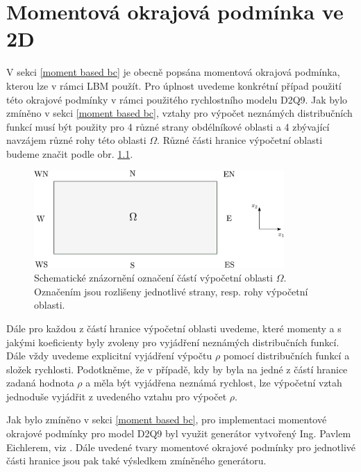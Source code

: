 \chapter{Momentová okrajová podmínka ve 2D}\label{priloha A}
V sekci \ref{moment based bc} je obecně popsána momentová okrajová podmínka, kterou lze v rámci LBM použít. Pro úplnost uvedeme konkrétní případ použití této okrajové podmínky v rámci použitého rychlostního modelu D2Q9. Jak bylo zmíněno v sekci \ref{moment based bc}, vztahy pro výpočet neznámých distribučních funkcí musí být použity pro 4 různé strany obdélníkové oblasti a 4 zbývající navzájem různé rohy této oblasti $ \Omega $. Různé části hranice výpočetní oblasti budeme značit podle obr. \ref{fig:oblast pro MBBC}.

\begin{figure}[H]
	\vspace{4mm}
	\centering
	\includegraphics[width=0.85\textwidth]{Images/oblastBC.pdf}
	\vspace{4mm}
	\caption{Schematické znázornění označení částí výpočetní oblasti $ \Omega $. Označením jsou rozlišeny jednotlivé strany, resp. rohy výpočetní oblasti.}  
	\label{fig:oblast pro MBBC}
	\vspace{1.8mm}
\end{figure}

Dále pro každou z částí hranice výpočetní oblasti uvedeme, které momenty a s jakými koeficienty byly zvoleny pro vyjádření neznámých distribučních funkcí. Dále vždy uvedeme explicitní vyjádření výpočtu $ \rho $ pomocí distribučních funkcí a složek rychlosti. Podotkněme, že v případě, kdy by byla na jedné z částí hranice zadaná hodnota $ \rho $ a měla být vyjádřena neznámá rychlost, lze výpočetní vztah jednoduše vyjádřit z uvedeného vztahu pro výpočet $ \rho $.

Jak bylo zmíněno v sekci \ref{moment based bc}, pro implementaci momentové okrajové podmínky pro model D2Q9 byl využit generátor vytvořený Ing. Pavlem Eichlerem, viz \cite{PE}. Dále uvedené tvary momentové okrajové podmínky pro jednotlivé části hranice jsou pak také výsledkem zmíněného generátoru.


